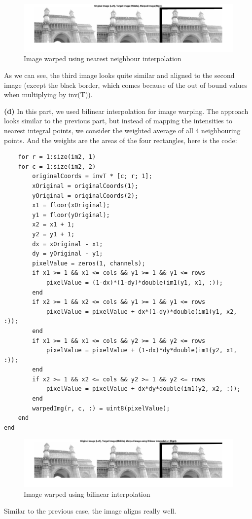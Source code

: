 \documentclass[12pt]{article}
\begin{document}
\begin{figure}[h]
    \centering
    \includegraphics[width=\linewidth]{Images/Q6/nearest.jpg}
    \caption{Image warped using nearest neighbour interpolation}
\end{figure}

As we can see, the third image looks quite similar and aligned to the second image (except the black border, which comes because of the out of bound values when multiplying by inv(T)).


\textbf{(d)}
In this part, we used bilinear interpolation for image warping. The approach looks similar to the previous part, but instead of mapping the intensities to nearest integral points, we consider the weighted average of all 4 neighbouring points. And the weights are the areas of the four rectangles, here is the code:
\begin{verbatim}
    for r = 1:size(im2, 1)
    for c = 1:size(im2, 2)
        originalCoords = invT * [c; r; 1];
        xOriginal = originalCoords(1);
        yOriginal = originalCoords(2);
        x1 = floor(xOriginal);
        y1 = floor(yOriginal);
        x2 = x1 + 1;
        y2 = y1 + 1;
        dx = xOriginal - x1;
        dy = yOriginal - y1;
        pixelValue = zeros(1, channels);
        if x1 >= 1 && x1 <= cols && y1 >= 1 && y1 <= rows
            pixelValue = (1-dx)*(1-dy)*double(im1(y1, x1, :));
        end
        if x2 >= 1 && x2 <= cols && y1 >= 1 && y1 <= rows
            pixelValue = pixelValue + dx*(1-dy)*double(im1(y1, x2, :));
        end
        if x1 >= 1 && x1 <= cols && y2 >= 1 && y2 <= rows
            pixelValue = pixelValue + (1-dx)*dy*double(im1(y2, x1, :));
        end
        if x2 >= 1 && x2 <= cols && y2 >= 1 && y2 <= rows
            pixelValue = pixelValue + dx*dy*double(im1(y2, x2, :));
        end
        warpedImg(r, c, :) = uint8(pixelValue);
    end
end   
\end{verbatim} 
\begin{figure}[h]
    \centering
    \includegraphics[width=\linewidth]{Images/Q6/bilinear.jpg}
    \caption{Image warped using bilinear interpolation}
\end{figure}
Similar to the previous case, the image aligns really well.
\end{document}
